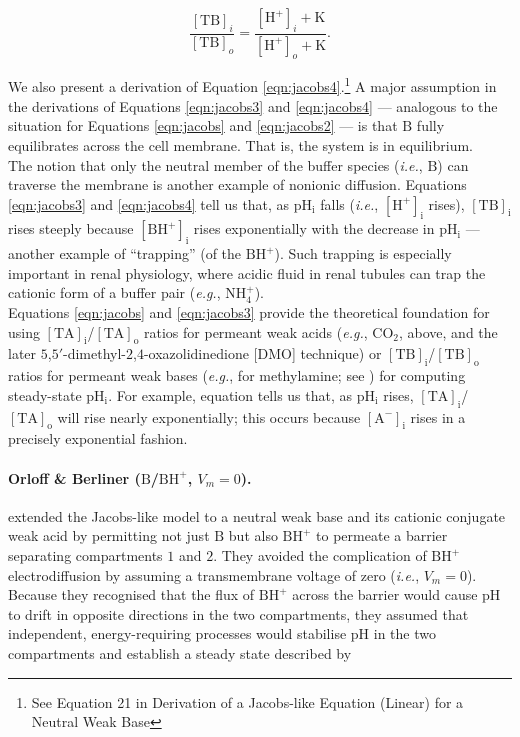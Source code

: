 \documentclass[fleqn,10pt]{physiome}
\begin{document}
\begin{equation}
\dfrac{\mathrm{[TB]}_i}{\mathrm{[TB]}_o}=\dfrac{\mathrm{[H^+]}_i+\mathrm{K}}{\mathrm{[H^+]}_o+\mathrm{K}}.
\label{eqn:jacobs4}
\end{equation}

We also present a derivation of Equation \ref{eqn:jacobs4}.\footnote{See Equation 21 in Derivation of a Jacobs-like Equation (Linear) for a Neutral Weak Base} A major assumption in the derivations of Equations \ref{eqn:jacobs3} and \ref{eqn:jacobs4} --- analogous to the situation for Equations \ref{eqn:jacobs} and \ref{eqn:jacobs2} --- is that $\mathrm{B}$ fully equilibrates across the cell membrane. That is, the system is in equilibrium.\\

The notion that only the neutral member of the buffer species (\emph{i.e.}, $\mathrm{B}$) can traverse the membrane is another example of nonionic diffusion. Equations \ref{eqn:jacobs3} and \ref{eqn:jacobs4} tell us that, as $\mathrm{pH_i}$ falls (\emph{i.e.}, $\mathrm{[H^+]_i}$ rises), $\mathrm{[TB]_i}$ rises steeply because $\mathrm{[BH^+]_i}$ rises exponentially with the decrease in $\mathrm{pH_i}$ --- another example of ``trapping'' (of the $\mathrm{BH^+}$). Such trapping is especially important in renal physiology, where acidic fluid in renal tubules can trap the cationic form of a buffer pair (\emph{e.g.}, $\mathrm{NH_4^+}$).\\

Equations \ref{eqn:jacobs} and \ref{eqn:jacobs3} provide the theoretical foundation for using $\mathrm{[TA]_i}$/$\mathrm{[TA]_o}$ ratios for permeant weak acids (\emph{e.g.}, $\mathrm{CO_2}$, above, and the later $5$,$5'$-dimethyl-$2$,$4$-oxazolidinedione [DMO] technique) or $\mathrm{[TB]_i}$/$\mathrm{[TB]_o}$ ratios for permeant weak bases (\emph{e.g.}, for methylamine; see \cite{boron1976comparison}) for computing steady-state $\mathrm{pH_i}$. For example, equation  tells us that, as $\mathrm{pH_i}$ rises, $\mathrm{[TA]_i}$/$\mathrm{[TA]_o}$ will rise nearly exponentially; this occurs because $\mathrm{[A^-]_i}$ rises in a precisely exponential fashion.

\paragraph{Orloff \& Berliner ($\mathrm{B}$/$\mathrm{BH^+}$, $V_m=0$).} \cite{orloff1956mechanism} extended the Jacobs-like model to a neutral weak base and its cationic conjugate weak acid by permitting not just $\mathrm{B}$ but also $\mathrm{BH^+}$ to permeate a barrier separating compartments $1$ and $2$. They avoided the complication of $\mathrm{BH^+}$ electrodiffusion by assuming a transmembrane voltage of zero (\emph{i.e.}, $V_m=0$). Because they recognised that the flux of $\mathrm{BH^+}$ across the barrier would cause $\mathrm{pH}$ to drift in opposite directions in the two compartments, they assumed that independent, energy-requiring processes would stabilise $\mathrm{pH}$ in the two compartments and establish a steady state described by
 
\end{document}
